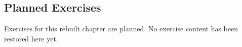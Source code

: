 \subsection*{Planned Exercises}

Exercises for this rebuilt chapter are planned. No exercise content has been
restored here yet.
